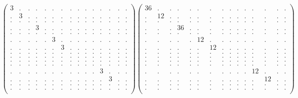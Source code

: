 \documentclass[12pt,a4paper]{amsart}
\begin{document}
\begin{align*}
\left(\begin{array}{rrrrrrrrrrrrrrr}%
3&.&.&.&.&.&.&.&.&.&.&.&.&.&.\\%
.&3&.&.&.&.&.&.&.&.&.&.&.&.&.\\%
.&.&.&.&.&.&.&.&.&.&.&.&.&.&.\\%
.&.&.&3&.&.&.&.&.&.&.&.&.&.&.\\%
.&.&.&.&.&.&.&.&.&.&.&.&.&.&.\\%
.&.&.&.&.&3&.&.&.&.&.&.&.&.&.\\%
.&.&.&.&.&.&3&.&.&.&.&.&.&.&.\\%
.&.&.&.&.&.&.&.&.&.&.&.&.&.&.\\%
.&.&.&.&.&.&.&.&.&.&.&.&.&.&.\\%
.&.&.&.&.&.&.&.&.&.&.&.&.&.&.\\%
.&.&.&.&.&.&.&.&.&.&.&.&.&.&.\\%
.&.&.&.&.&.&.&.&.&.&.&3&.&.&.\\%
.&.&.&.&.&.&.&.&.&.&.&.&3&.&.\\%
.&.&.&.&.&.&.&.&.&.&.&.&.&.&.\\%
.&.&.&.&.&.&.&.&.&.&.&.&.&.&.\\%
\end{array}\right)%
\left(\begin{array}{rrrrrrrrrrrrrrr}%
36&.&.&.&.&.&.&.&.&.&.&.&.&.&.\\%
.&12&.&.&.&.&.&.&.&.&.&.&.&.&.\\%
.&.&.&.&.&.&.&.&.&.&.&.&.&.&.\\%
.&.&.&36&.&.&.&.&.&.&.&.&.&.&.\\%
.&.&.&.&.&.&.&.&.&.&.&.&.&.&.\\%
.&.&.&.&.&12&.&.&.&.&.&.&.&.&.\\%
.&.&.&.&.&.&12&.&.&.&.&.&.&.&.\\%
.&.&.&.&.&.&.&.&.&.&.&.&.&.&.\\%
.&.&.&.&.&.&.&.&.&.&.&.&.&.&.\\%
.&.&.&.&.&.&.&.&.&.&.&.&.&.&.\\%
.&.&.&.&.&.&.&.&.&.&.&.&.&.&.\\%
.&.&.&.&.&.&.&.&.&.&.&12&.&.&.\\%
.&.&.&.&.&.&.&.&.&.&.&.&12&.&.\\%
.&.&.&.&.&.&.&.&.&.&.&.&.&.&.\\%
.&.&.&.&.&.&.&.&.&.&.&.&.&.&.\\%
\end{array}\right)%
\end{align*}
\end{document}

